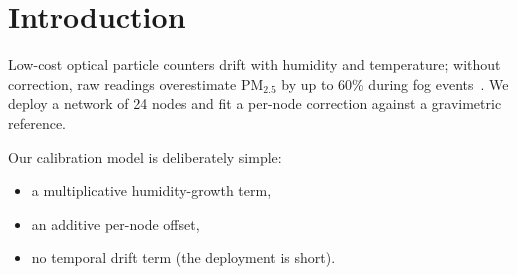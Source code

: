 \section{Introduction}
\label{sec:intro}

Low-cost optical particle counters drift with humidity and temperature;
without correction, raw readings overestimate $\mathrm{PM}_{2.5}$ by up to
60\% during fog events~\cite{crilley2018}. We deploy a network of 24 nodes
and fit a per-node correction against a gravimetric reference.

Our calibration model is deliberately simple:
\begin{itemize}
  \item a multiplicative humidity-growth term,
  \item an additive per-node offset,
  \item no temporal drift term (the deployment is short).
\end{itemize}
